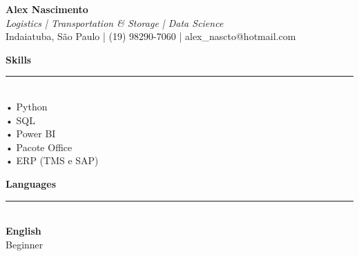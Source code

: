 \documentclass[10pt,a4paper]{article}
\begin{document}
\begin{center}
    {\Huge \textbf{\color{primarycolor}Alex Nascimento}} \\
    \vspace{1mm}
    {\large \textit{Logistics | Transportation & Storage | Data Science}} \\
    \vspace{2mm}
    \small Indaiatuba, São Paulo | (19) 98290-7060 | alex_nascto@hotmail.com
\end{center}

\vspace{4mm}

\begin{minipage}[t]{0.33\textwidth}
    \raggedright
    
    {\color{primarycolor}\large \textbf{Skills}} \\
    \rule{\linewidth}{0.5pt} \\
    \vspace{1mm}
            • Python \\
            • SQL \\
            • Power BI \\
            • Pacote Office \\
            • ERP (TMS e SAP) \\
        
    \vspace{5mm}
    
    {\color{primarycolor}\large \textbf{Languages}} \\
    \rule{\linewidth}{0.5pt} \\
    \vspace{1mm}
            \textbf{English} \\
        \small Beginner \\
        \vspace{1mm}
    \end{minipage}
\hfill
\begin{minipage}[t]{0.02\textwidth}
    \hfill
\end{minipage}
\hfill
\end{document}
